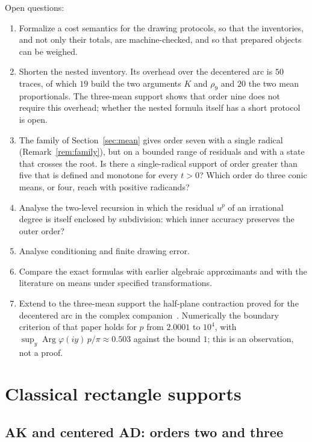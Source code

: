 Open questions:
\begin{enumerate}[label=\arabic*.]
\item Formalize a cost semantics for the drawing protocols, so that the inventories, and not only
  their totals, are machine-checked, and so that prepared objects can be weighed.
\item Shorten the nested inventory. Its overhead over the decentered arc is $50$ traces, of which $19$
  build the two arguments $K$ and $\rho_9$ and $20$ the two mean proportionals. The three-mean support
  shows that order nine does not require this overhead; whether the nested formula itself has a short
  protocol is open.
\item The family of Section~\ref{sec:mean} gives order seven with a single radical
  (Remark~\ref{rem:family}), but on a bounded range of residuals and with a state that crosses the
  root. Is there a single-radical support of order greater than five that is defined and monotone for
  every $t>0$? Which order do three conic means, or four, reach with positive radicands?
\item Analyse the two-level recursion in which the residual $u^{p}$ of an irrational degree is itself
  enclosed by subdivision: which inner accuracy preserves the outer order?
\item Analyse conditioning and finite drawing error.
\item Compare the exact formulas with earlier algebraic approximants and with the literature on means
  under specified transformations.
\item Extend to the three-mean support the half-plane contraction proved for the decentered arc in the
  complex companion~\cite{companion}. Numerically the boundary criterion of that paper holds for $p$
  from $2.0001$ to $10^{4}$, with $\sup_y\operatorname{Arg}\varphi(iy)\,p/\pi\approx0.503$ against the
  bound $1$; this is an observation, not a proof.
\end{enumerate}

\FloatBarrier
\appendix
\section{Classical rectangle supports}\label{app:classical}

\subsection{AK and centered AD: orders two and three}

